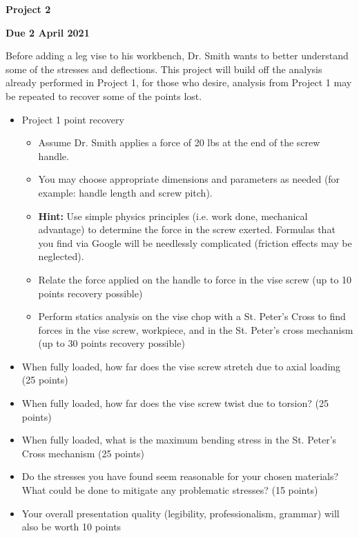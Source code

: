 \documentclass[12pt, oneside]{article}
\begin{document}
\begin{center}
\textbf{\Large Project 2}

\textbf{Due 2 April 2021}
\end{center}

Before adding a leg vise to his workbench, Dr. Smith wants to better understand some of the stresses and deflections.
This project will build off the analysis already performed in Project 1, for those who desire, analysis from Project 1 may be repeated to recover some of the points lost.
\begin{itemize}
	\item Project 1 point recovery
		\begin{itemize}
			\item Assume Dr. Smith applies a force of 20 lbs at the end of the screw handle.
			\item You may choose appropriate dimensions and parameters as needed (for example: handle length and screw pitch). 
			\item \textbf{Hint:} Use simple physics principles (i.e. work done, mechanical advantage) to determine the force in the screw exerted. Formulas that you find via Google will be needlessly complicated (friction effects may be neglected).
			\item Relate the force applied on the handle to force in the vise screw (up to 10 points recovery possible) 
			\item Perform statics analysis on the vise chop with a St. Peter's Cross to find forces in the vise screw, workpiece, and in the St. Peter's cross mechanism (up to 30 points recovery possible)
		\end{itemize}
	\item When fully loaded, how far does the vise screw stretch due to axial loading (25 points)
	\item When fully loaded, how far does the vise screw twist due to torsion? (25 points)
	\item When fully loaded, what is the maximum bending stress in the St. Peter's Cross mechanism (25 points)
	\item Do the stresses you have found seem reasonable for your chosen materials? What could be done to mitigate any problematic stresses? (15 points)
	\item Your overall presentation quality (legibility, professionalism, grammar) will also be worth 10 points
\end{itemize}
\end{document}
